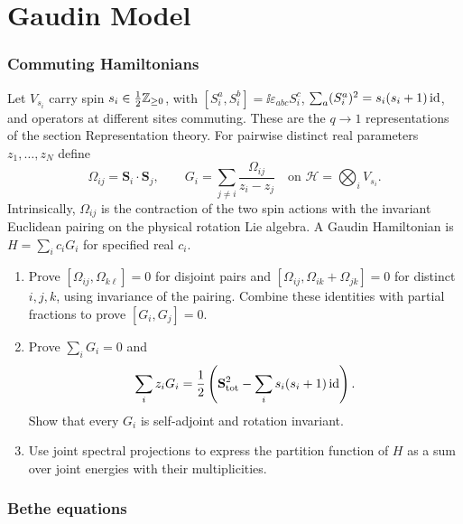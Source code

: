 \part{Gaudin Model}

\section{Commuting Hamiltonians}

\begin{exercise}
Let $V_{s_i}$ carry spin $s_i\in\frac12\mathbb Z_{\ge0}$, with
$[S_i^a,S_i^b]=\ii\varepsilon_{abc}S_i^c$,
$\sum_a(S_i^a)^2=s_i(s_i+1)\operatorname{id}$, and operators at different
sites commuting. These are the $q\to1$ representations of the
section Representation theory. For pairwise distinct real
parameters $z_1,\dots,z_N$ define
\[
 \Omega_{ij}=\mathbf S_i\cdot\mathbf S_j,\qquad
 G_i=\sum_{j\ne i}\frac{\Omega_{ij}}{z_i-z_j}
 \quad\text{on }\mathcal H=\bigotimes_iV_{s_i}.
\]
Intrinsically, $\Omega_{ij}$ is the contraction of the two spin
actions with the invariant Euclidean pairing on the physical
rotation Lie algebra. A Gaudin Hamiltonian is
$H=\sum_i c_iG_i$ for specified real $c_i$.
\begin{enumerate}[label=(\alph*)]
\item Prove $[\Omega_{ij},\Omega_{k\ell}]=0$ for disjoint
pairs and $[\Omega_{ij},\Omega_{ik}+\Omega_{jk}]=0$ for
distinct $i,j,k$, using invariance of the pairing.
Combine these identities with partial fractions to prove
$[G_i,G_j]=0$.
\item Prove $\sum_iG_i=0$ and
\[
 \sum_i z_iG_i=\frac12\left(
 \mathbf S_{\rm tot}^2-\sum_i s_i(s_i+1)\operatorname{id}\right).
\]
Show that every $G_i$ is self-adjoint and rotation invariant.
\item Use joint spectral projections to express the partition
function of $H$ as a sum over joint energies with their
multiplicities.
\end{enumerate}
\end{exercise}

\section{Bethe equations}

